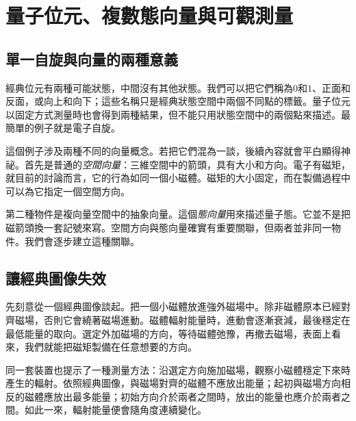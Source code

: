 \chapter{量子位元、複數態向量與可觀測量}


\section{單一自旋與向量的兩種意義}

經典位元有兩種可能狀態，中間沒有其他狀態。我們可以把它們稱為\(0\)和\(1\)、正面和反面，或向上和向下；這些名稱只是經典狀態空間中兩個不同點的標籤。量子位元以固定方式測量時也會得到兩種結果，但不能只用狀態空間中的兩個點來描述。最簡單的例子就是電子自旋。

這個例子涉及兩種不同的向量概念。若把它們混為一談，後續內容就會平白顯得神祕。首先是普通的\emph{空間向量}：三維空間中的箭頭，具有大小和方向。電子有磁矩，就目前的討論而言，它的行為如同一個小磁體。磁矩的大小固定，而在製備過程中可以為它指定一個空間方向。

第二種物件是複向量空間中的抽象向量。這個\emph{態向量}用來描述量子態。它並不是把磁箭頭換一套記號來寫。空間方向與態向量確實有重要關聯，但兩者並非同一物件。我們會逐步建立這種關聯。

\section{讓經典圖像失效}

先刻意從一個經典圖像談起。把一個小磁體放進強外磁場中。除非磁體原本已經對齊磁場，否則它會繞著磁場進動。磁體輻射能量時，進動會逐漸衰減，最後穩定在最低能量的取向。選定外加磁場的方向，等待磁體弛豫，再撤去磁場，表面上看來，我們就能把磁矩製備在任意想要的方向。

同一套裝置也提示了一種測量方法：沿選定方向施加磁場，觀察小磁體穩定下來時產生的輻射。依照經典圖像，與磁場對齊的磁體不應放出能量；起初與磁場方向相反的磁體應放出最多能量；初始方向介於兩者之間時，放出的能量也應介於兩者之間。如此一來，輻射能量便會隨角度連續變化。

